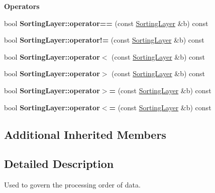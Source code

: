 \begin{Indent}\textbf{ Operators}\par
\begin{DoxyCompactItemize}
\item 
\mbox{\label{structrev_1_1_sorting_layer_ab50aadf789939fa22f7bf2192fb9f3d6}} 
bool {\bfseries Sorting\+Layer\+::operator==} (const \mbox{\hyperlink{structrev_1_1_sorting_layer}{Sorting\+Layer}} \&b) const
\item 
\mbox{\label{structrev_1_1_sorting_layer_a8e317c6f3bd8be14baf889b99cdc39a3}} 
bool {\bfseries Sorting\+Layer\+::operator!=} (const \mbox{\hyperlink{structrev_1_1_sorting_layer}{Sorting\+Layer}} \&b) const
\item 
\mbox{\label{structrev_1_1_sorting_layer_abb06da79709b686c63dd6f1c21e2c02f}} 
bool {\bfseries Sorting\+Layer\+::operator$<$} (const \mbox{\hyperlink{structrev_1_1_sorting_layer}{Sorting\+Layer}} \&b) const
\item 
\mbox{\label{structrev_1_1_sorting_layer_aad557d55e29888710ab038ee47039e78}} 
bool {\bfseries Sorting\+Layer\+::operator$>$} (const \mbox{\hyperlink{structrev_1_1_sorting_layer}{Sorting\+Layer}} \&b) const
\item 
\mbox{\label{structrev_1_1_sorting_layer_a0ae2da4b46d4f58354018d8d3cd08660}} 
bool {\bfseries Sorting\+Layer\+::operator$>$=} (const \mbox{\hyperlink{structrev_1_1_sorting_layer}{Sorting\+Layer}} \&b) const
\item 
\mbox{\label{structrev_1_1_sorting_layer_a616d89b8011865b0fab75c87a7124e84}} 
bool {\bfseries Sorting\+Layer\+::operator$<$=} (const \mbox{\hyperlink{structrev_1_1_sorting_layer}{Sorting\+Layer}} \&b) const
\end{DoxyCompactItemize}
\end{Indent}
\subsection*{Additional Inherited Members}


\subsection{Detailed Description}
Used to govern the processing order of data. 

